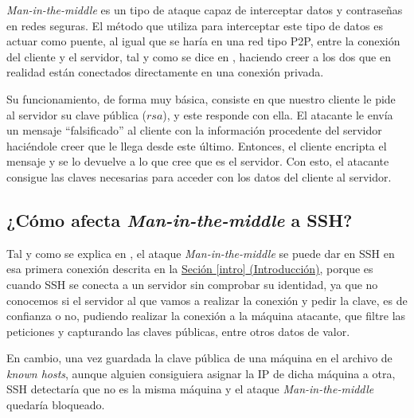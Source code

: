 \documentclass[10pt,a4paper,spanish]{article}
\begin{document}
\textit{Man-in-the-middle} es un tipo de ataque capaz de interceptar datos y contraseñas en redes seguras. El método que utiliza para interceptar este tipo de datos es actuar como puente, al igual que se haría en una red tipo P2P, entre la conexión del cliente y el servidor, tal y como se dice en \cite{mitmdef}, haciendo creer a los dos que en realidad están conectados directamente en una conexión privada.

Su funcionamiento, de forma muy básica, consiste en que nuestro cliente le pide al servidor su clave pública ($rsa$), y este responde con ella. El atacante le envía un mensaje ``falsificado'' al cliente con la información procedente del servidor haciéndole creer que le llega desde este último. Entonces, el cliente encripta el mensaje y se lo devuelve a lo que cree que es el servidor. Con esto, el atacante consigue las claves necesarias para acceder con los datos del cliente al servidor.

\subsection{¿Cómo afecta \textit{Man-in-the-middle} a SSH?}
Tal y como se explica en \cite{valenciano}, el ataque \textit{Man-in-the-middle} se puede dar en SSH en esa primera conexión descrita en la \hyperref[intro]{Seción \ref*{intro} (Introducción)}, porque es cuando SSH se conecta a un servidor sin comprobar su identidad, ya que no conocemos si el servidor al que vamos a realizar la conexión y pedir la clave, es de confianza o no, pudiendo realizar la conexión a la máquina atacante, que filtre las peticiones y capturando las claves públicas, entre otros datos de valor. 

En cambio, una vez guardada la clave pública de una máquina en el archivo de \textit{known hosts}, aunque alguien consiguiera asignar la IP de dicha máquina a otra, SSH detectaría que no es la misma máquina y el ataque \textit{Man-in-the-middle} quedaría bloqueado.




\end{document}

